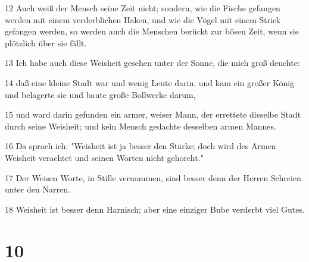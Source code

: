 \par 12 Auch weiß der Mensch seine Zeit nicht; sondern, wie die Fische gefangen werden mit einem verderblichen Haken, und wie die Vögel mit einem Strick gefangen werden, so werden auch die Menschen berückt zur bösen Zeit, wenn sie plötzlich über sie fällt.
\par 13 Ich habe auch diese Weisheit gesehen unter der Sonne, die mich groß deuchte:
\par 14 daß eine kleine Stadt war und wenig Leute darin, und kam ein großer König und belagerte sie und baute große Bollwerke darum,
\par 15 und ward darin gefunden ein armer, weiser Mann, der errettete dieselbe Stadt durch seine Weisheit; und kein Mensch gedachte desselben armen Mannes.
\par 16 Da sprach ich: "Weisheit ist ja besser den Stärke; doch wird des Armen Weisheit verachtet und seinen Worten nicht gehorcht."
\par 17 Der Weisen Worte, in Stille vernommen, sind besser denn der Herren Schreien unter den Narren.
\par 18 Weisheit ist besser denn Harnisch; aber eine einziger Bube verderbt viel Gutes.

\chapter{10}

